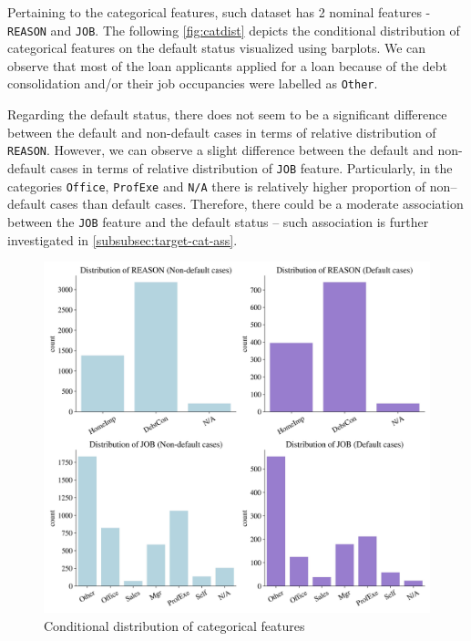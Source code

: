 Pertaining to the categorical features, such dataset has 2 nominal features - \texttt{REASON} and \texttt{JOB}. The following \autoref{fig:catdist} depicts the conditional distribution of categorical features on the default status visualized using barplots.
We can observe that most of the loan applicants applied for a loan because of the debt consolidation and/or their job occupancies were labelled as \texttt{Other}.

Regarding the default status, there does not seem to be a significant difference between the default and non-default cases in terms of relative distribution of \texttt{REASON}.
However, we can observe a slight difference between the default and non-default cases in terms of relative distribution of \texttt{JOB} feature. Particularly, in the categories \texttt{Office}, \texttt{ProfExe} and \texttt{N/A} there is relatively higher proportion of non--default cases than default cases. Therefore, there could be a moderate association between the \texttt{JOB} feature and the default status -- such association is further investigated in \autoref{subsubsec:target-cat-ass}.


\begin{figure}[H]
    \centering
    \caption{Conditional distribution of categorical features}\vspace{0.5em}
    \label{fig:catdist}
    \includegraphics[width=140mm]{Figures/Categorical_Features_Distribution.jpg}
    \vspace{-1em}
    \end{figure}

